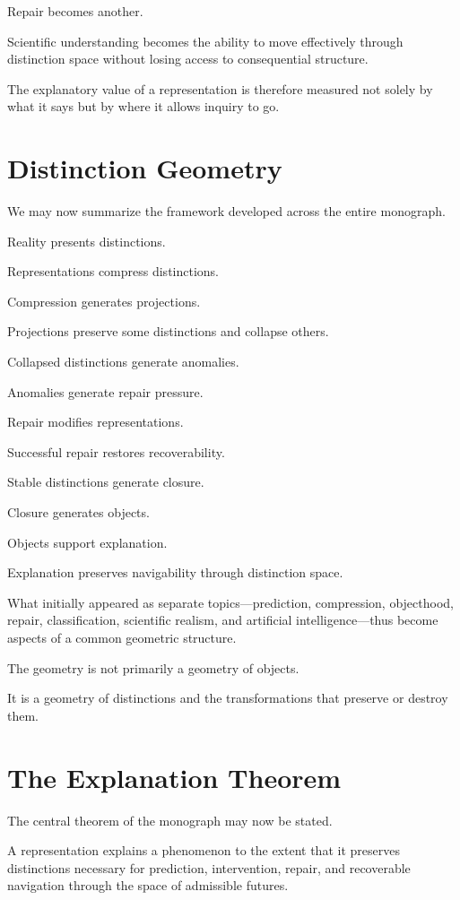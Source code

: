 \documentclass[11pt,oneside,openany]{book}
\begin{document}
Repair becomes another.

Scientific understanding becomes the ability to move effectively through distinction space without losing access to consequential structure.

The explanatory value of a representation is therefore measured not solely by what it says but by where it allows inquiry to go.

\section{Distinction Geometry}

We may now summarize the framework developed across the entire monograph.

Reality presents distinctions.

Representations compress distinctions.

Compression generates projections.

Projections preserve some distinctions and collapse others.

Collapsed distinctions generate anomalies.

Anomalies generate repair pressure.

Repair modifies representations.

Successful repair restores recoverability.

Stable distinctions generate closure.

Closure generates objects.

Objects support explanation.

Explanation preserves navigability through distinction space.

What initially appeared as separate topics—prediction, compression, objecthood, repair, classification, scientific realism, and artificial intelligence—thus become aspects of a common geometric structure.

The geometry is not primarily a geometry of objects.

It is a geometry of distinctions and the transformations that preserve or destroy them.

\section{The Explanation Theorem}

The central theorem of the monograph may now be stated.

\begin{theorem}

A representation explains a phenomenon to the extent that it preserves distinctions necessary for prediction, intervention, repair, and recoverable navigation through the space of admissible futures.

\end{theorem}
\end{document}
